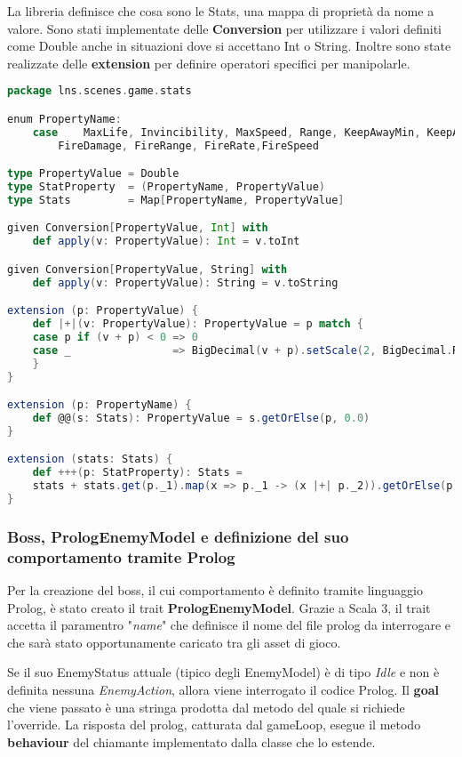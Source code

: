 La libreria definisce che cosa sono le Stats, una mappa di proprietà da nome a valore.
Sono stati implementate delle \textbf{Conversion} per utilizzare i valori definiti come Double anche in situazioni 
dove si accettano Int o String.
Inoltre sono state realizzate delle \textbf{extension} per definire operatori specifici per manipolarle.

\begin{lstlisting}[language=Scala]
package lns.scenes.game.stats

enum PropertyName:
	case 	MaxLife, Invincibility, MaxSpeed, Range, KeepAwayMin, KeepAwayMax, Damage, 
		FireDamage, FireRange, FireRate,FireSpeed

type PropertyValue = Double
type StatProperty  = (PropertyName, PropertyValue)
type Stats         = Map[PropertyName, PropertyValue]

given Conversion[PropertyValue, Int] with
	def apply(v: PropertyValue): Int = v.toInt

given Conversion[PropertyValue, String] with
	def apply(v: PropertyValue): String = v.toString

extension (p: PropertyValue) {
	def |+|(v: PropertyValue): PropertyValue = p match {
	case p if (v + p) < 0 => 0
	case _                => BigDecimal(v + p).setScale(2, BigDecimal.RoundingMode.HALF_UP).toDouble
	}
}

extension (p: PropertyName) {
	def @@(s: Stats): PropertyValue = s.getOrElse(p, 0.0)
}

extension (stats: Stats) {
	def +++(p: StatProperty): Stats =
	stats + stats.get(p._1).map(x => p._1 -> (x |+| p._2)).getOrElse(p)
}
\end{lstlisting}

\subsubsection{Boss, PrologEnemyModel e definizione del suo comportamento tramite Prolog}
Per la creazione del boss, il cui comportamento è definito tramite linguaggio Prolog, è stato creato il trait \textbf{PrologEnemyModel}. 
Grazie a Scala 3, il trait accetta il paramentro "\textit{name}" che definisce il nome del file prolog da interrogare e che sarà stato opportunamente caricato tra gli asset di gioco.

Se il suo EnemyStatus attuale (tipico degli EnemyModel) è di tipo \textit{Idle} e non è definita nessuna \textit{EnemyAction}, 
allora viene interrogato il codice Prolog. 
Il \textbf{goal} che viene passato è una stringa prodotta dal metodo del quale si richiede l'override.
La risposta del prolog, catturata dal gameLoop, esegue il metodo \textbf{behaviour} del chiamante implementato dalla classe che lo estende. 


